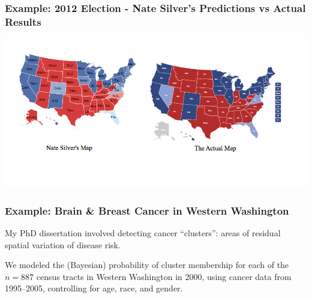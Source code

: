 \documentclass[handout]{beamer}
\newcommand{\blue}[1]{\textcolor{blue2}{#1}}
\begin{document}
\begin{frame}[fragile]
\frametitle{Example: 2012 Election - Nate Silver's Predictions vs Actual Results}
\begin{center}
\includegraphics[width=\textwidth]{figure/nate_silver.jpg}
\end{center}
\begin{center}
\end{center}
\end{frame}


\begin{frame}[fragile]
\frametitle{Example: Brain \& Breast Cancer in Western Washington}

My PhD dissertation involved detecting cancer ``clusters'': areas of \blue{residual spatial variation} of disease risk.

\vspace{0.5cm}

\pause We modeled the (Bayesian) probability of cluster membership for each of the $n=887$ census tracts in Western Washington in 2000, using cancer data from 1995--2005, controlling for age, race, and gender.  


\end{frame}
\end{document}
